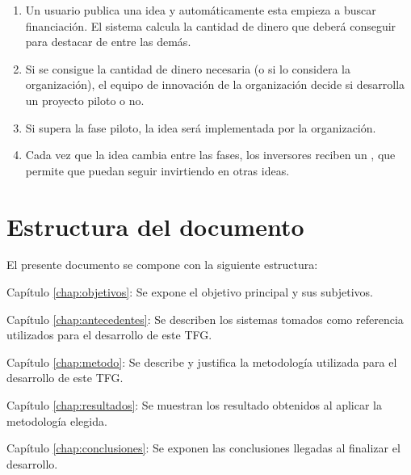  \begin{enumerate}
 	\item Un usuario publica una idea y automáticamente esta empieza a buscar financiación. El sistema calcula la cantidad de dinero que deberá conseguir para destacar de entre las demás.
 	\item Si se consigue la cantidad de dinero necesaria (o si lo considera la organización), el equipo de
 	 innovación de la organización decide si desarrolla un proyecto piloto o no.
 	 \item Si supera la fase piloto, la idea será implementada por la organización.
 	 \item Cada vez que la idea cambia entre las fases, los inversores reciben un , que permite
 	 que puedan seguir invirtiendo en otras ideas.
 \end{enumerate}
 
  
 
\section{Estructura del documento}

El presente documento se compone con la siguiente estructura:

\begin{definitionlist}
\item[Capítulo \ref{chap:objetivos}: \nameref{chap:objetivos}] Se expone el objetivo principal y sus subjetivos.
 \item[Capítulo \ref{chap:antecedentes}: \nameref{chap:antecedentes}] Se describen los sistemas tomados como referencia utilizados para 
 el desarrollo de este \acs{TFG}.
  \item [Capítulo \ref{chap:metodo}: \nameref{chap:metodo}] Se describe y justifica la metodología utilizada para el desarrollo de este \acs{TFG}.
  \item[Capítulo \ref{chap:resultados}: \nameref{chap:resultados}] Se muestran los resultado obtenidos al aplicar la metodología elegida.
  \item[Capítulo \ref{chap:conclusiones}: \nameref{chap:conclusiones}] Se exponen las conclusiones llegadas al finalizar el desarrollo.
\end{definitionlist}

